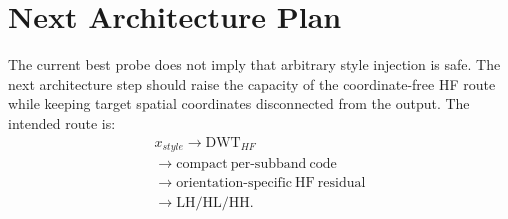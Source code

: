 \documentclass[10pt,twocolumn]{article}
\begin{document}
\section{Next Architecture Plan}

The current best probe does not imply that arbitrary style injection is safe. The next
architecture step should raise the capacity of the coordinate-free HF route while keeping
target spatial coordinates disconnected from the output. The intended route is:
\[
  \begin{array}{l}
  x_{style}\rightarrow \mathrm{DWT}_{HF}\\
  \rightarrow\mathrm{compact\ per\mbox{-}subband\ code}\\
  \rightarrow\mathrm{orientation\mbox{-}specific\ HF\ residual}\\
  \rightarrow\mathrm{LH/HL/HH}.
  \end{array}
\]
\end{document}
